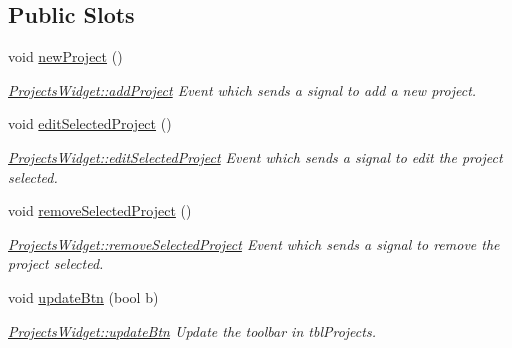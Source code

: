 \subsection*{Public Slots}
\begin{DoxyCompactItemize}
\item 
\hypertarget{classGui_1_1Widgets_1_1ProjectsWidget_acd6cd65ef7bf569ce4e44436d2f8b4f4}{void \hyperlink{classGui_1_1Widgets_1_1ProjectsWidget_acd6cd65ef7bf569ce4e44436d2f8b4f4}{new\-Project} ()}\label{classGui_1_1Widgets_1_1ProjectsWidget_acd6cd65ef7bf569ce4e44436d2f8b4f4}

\begin{DoxyCompactList}\small\item\em \hyperlink{classGui_1_1Widgets_1_1ProjectsWidget_a25a20fde082c2698d7067d10e5795c0f}{Projects\-Widget\-::add\-Project} Event which sends a signal to add a new project. \end{DoxyCompactList}\item 
\hypertarget{classGui_1_1Widgets_1_1ProjectsWidget_a33284320194d2c20ac6a47ebaaa57ad4}{void \hyperlink{classGui_1_1Widgets_1_1ProjectsWidget_a33284320194d2c20ac6a47ebaaa57ad4}{edit\-Selected\-Project} ()}\label{classGui_1_1Widgets_1_1ProjectsWidget_a33284320194d2c20ac6a47ebaaa57ad4}

\begin{DoxyCompactList}\small\item\em \hyperlink{classGui_1_1Widgets_1_1ProjectsWidget_a33284320194d2c20ac6a47ebaaa57ad4}{Projects\-Widget\-::edit\-Selected\-Project} Event which sends a signal to edit the project selected. \end{DoxyCompactList}\item 
\hypertarget{classGui_1_1Widgets_1_1ProjectsWidget_a02d9111ae56ff401bc512fa218161d94}{void \hyperlink{classGui_1_1Widgets_1_1ProjectsWidget_a02d9111ae56ff401bc512fa218161d94}{remove\-Selected\-Project} ()}\label{classGui_1_1Widgets_1_1ProjectsWidget_a02d9111ae56ff401bc512fa218161d94}

\begin{DoxyCompactList}\small\item\em \hyperlink{classGui_1_1Widgets_1_1ProjectsWidget_a02d9111ae56ff401bc512fa218161d94}{Projects\-Widget\-::remove\-Selected\-Project} Event which sends a signal to remove the project selected. \end{DoxyCompactList}\item 
void \hyperlink{classGui_1_1Widgets_1_1ProjectsWidget_a3051880516e89826876afdf01fa6637a}{update\-Btn} (bool b)
\begin{DoxyCompactList}\small\item\em \hyperlink{classGui_1_1Widgets_1_1ProjectsWidget_a3051880516e89826876afdf01fa6637a}{Projects\-Widget\-::update\-Btn} Update the toolbar in tbl\-Projects. \end{DoxyCompactList}\end{DoxyCompactItemize}
